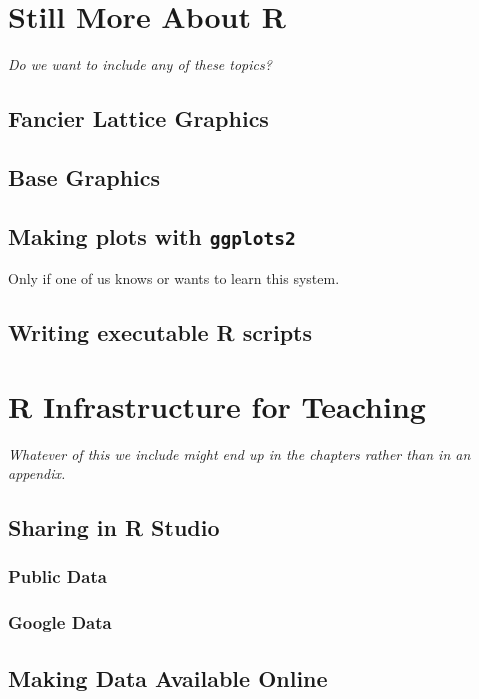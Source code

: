 \chapter{Still More About R}







\emph{Do we want to include any of these topics?}

\section{Fancier Lattice Graphics}

\section{Base Graphics}

\section{Making plots with \texttt{ggplots2}}

Only if one of us knows or wants to learn this system.

\section{Writing executable R scripts}

\chapter{R Infrastructure for Teaching}

\emph{Whatever of this we include might end up in the chapters rather than in 
an appendix.}

\section{Sharing in R Studio}
\subsection{Public Data}
\subsection{Google Data}

\section{Making Data Available Online}


